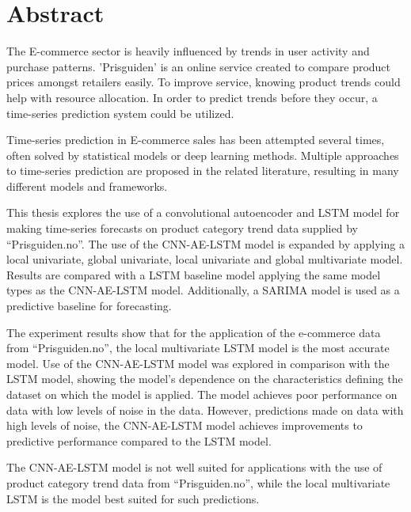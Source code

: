 \section*{Abstract}
\label{section:Abstract}

The E-commerce sector is heavily influenced by trends in user activity and purchase patterns.
'Prisguiden' is an online service created to compare product prices amongst retailers easily.
To improve service, knowing product trends could help with resource allocation.
In order to predict trends before they occur, a time-series prediction system could be utilized.


Time-series prediction in E-commerce sales has been attempted several times,
often solved by statistical models or deep learning methods.
Multiple approaches to time-series prediction are proposed in the related literature,
resulting in many different models and frameworks.


This thesis explores the use of a convolutional autoencoder and LSTM model for making time-series
forecasts on product category trend data supplied by ``Prisguiden.no''.
The use of the CNN-AE-LSTM model is expanded by applying a local univariate, global univariate, local univariate and global multivariate model.
Results are compared with a LSTM baseline model applying the same model types as the CNN-AE-LSTM model.
Additionally, a SARIMA model is used as a predictive baseline for forecasting.


The experiment results show that for the application of the e-commerce data from ``Prisguiden.no'',
the local multivariate LSTM model is the most accurate model.
Use of the CNN-AE-LSTM model was explored in comparison with the LSTM model,
showing the model's dependence on the characteristics defining the dataset on which the model is applied.
The model achieves poor performance on data with low levels of noise in the data.
However, predictions made on data with high levels of noise, the CNN-AE-LSTM model achieves
improvements to predictive performance compared to the LSTM model.


The CNN-AE-LSTM model is not well suited for applications with the use of product category trend data from ``Prisguiden.no'',
while the local multivariate LSTM is the model best suited for such predictions.







